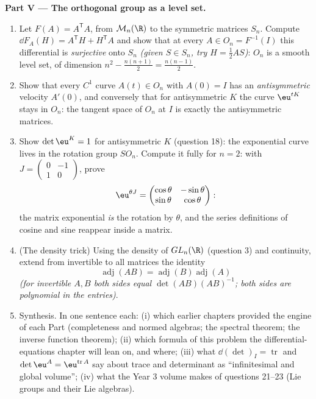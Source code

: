 \begin{problem}
\medskip
\noindent\textbf{Part V --- The orthogonal group as a level
set.}
\begin{enumerate}[resume]
  \item Let $F(A) = A^{\mathsf T}A$, from $\mathcal M_n(\R)$ to
        the symmetric matrices $S_n$. Compute $\dd F_A(H) =
        A^{\mathsf T}H + H^{\mathsf T}A$ and show that at every
        $A \in O_n = F^{-1}(I)$ this differential is
        \emph{surjective} onto $S_n$ \emph{(given $S \in S_n$,
        try $H = \frac12 AS$)}: $O_n$ is a smooth level set,
        of dimension $n^2 - \frac{n(n+1)}2 = \frac{n(n-1)}2$.
  \item Show that every $C^1$ curve $A(t) \in O_n$ with $A(0) =
        I$ has an \emph{antisymmetric} velocity $A'(0)$, and
        conversely that for antisymmetric $K$ the curve
        $\eu^{tK}$ stays in $O_n$: the tangent space of $O_n$
        at $I$ is exactly the antisymmetric matrices.
  \item Show $\det\eu^{K} = 1$ for antisymmetric $K$ (question
        18): the exponential curve lives in the rotation group
        $SO_n$. Compute it fully for $n = 2$: with $J =
        \begin{pmatrix}0 & -1\\ 1 & 0\end{pmatrix}$, prove
        \[
        \eu^{\theta J} = \begin{pmatrix} \cos\theta &
        -\sin\theta\\ \sin\theta & \cos\theta\end{pmatrix} :
        \]
        the matrix exponential \emph{is} the rotation by
        $\theta$, and the series definitions of cosine and sine
        reappear inside a matrix.
  \item (The density trick) Using the density of $GL_n(\R)$
        (question 3) and continuity, extend from invertible to
        all matrices the identity
        \[
        \operatorname{adj}(AB) =
        \operatorname{adj}(B)\operatorname{adj}(A)
        \]
        \emph{(for invertible $A, B$ both sides equal
        $\det(AB)(AB)^{-1}$; both sides are polynomial in the
        entries)}.
  \item Synthesis. In one sentence each: (i) which earlier
        chapters provided the engine of each Part
        (completeness and normed algebras; the spectral
        theorem; the inverse function theorem); (ii) which
        formula of this problem the differential-equations
        chapter will lean on, and where; (iii) what
        $\dd(\det)_I = \operatorname{tr}$ and $\det\eu^A =
        \eu^{\operatorname{tr}A}$ say about trace and
        determinant as ``infinitesimal and global volume'';
        (iv) what the Year 3 volume makes of questions
        21--23 (Lie groups and their Lie algebras).
\end{enumerate}
\end{problem}
